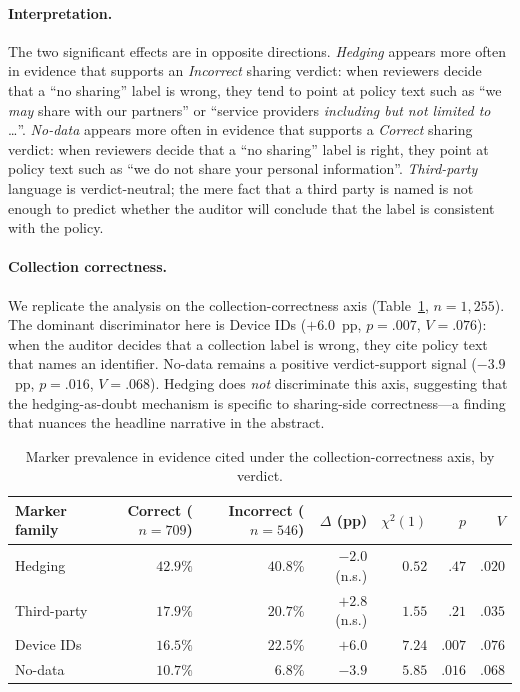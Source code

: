 \documentclass[11pt,a4paper]{article}
\begin{document}
\paragraph{Interpretation.}
The two significant effects are in opposite directions.
\emph{Hedging} appears more often in evidence that supports an
\emph{Incorrect} sharing verdict: when reviewers decide that a
``no sharing'' label is wrong, they tend to point at policy text such
as ``we \emph{may} share with our partners'' or ``service providers
\emph{including but not limited to} \dots''. \emph{No-data} appears
more often in evidence that supports a \emph{Correct} sharing
verdict: when reviewers decide that a ``no sharing'' label is right,
they point at policy text such as ``we do not share your personal
information''. \emph{Third-party} language is verdict-neutral; the
mere fact that a third party is named is not enough to predict whether
the auditor will conclude that the label is consistent with the policy.

\paragraph{Collection correctness.}
We replicate the analysis on the collection-correctness axis
(Table~\ref{tab:disc-collect}, $n=1{,}255$). The dominant
discriminator here is Device IDs ($+6.0$~pp, $p=.007$, $V=.076$):
when the auditor decides that a collection label is wrong, they cite
policy text that names an identifier. No-data remains a positive
verdict-support signal ($-3.9$~pp, $p=.016$, $V=.068$). Hedging
does \emph{not} discriminate this axis, suggesting that the
hedging-as-doubt mechanism is specific to sharing-side
correctness---a finding that nuances the headline narrative in the
abstract.

\begin{table}[t]
\centering\small
\caption{Marker prevalence in evidence cited under the
collection-correctness axis, by verdict.}
\label{tab:disc-collect}
\begin{tabular}{lrrrrrr}
\toprule
Marker family & Correct ($n=709$) & Incorrect ($n=546$) & $\Delta$ (pp) & $\chi^{2}(1)$ & $p$ & $V$ \\
\midrule
Hedging       & $42.9\%$ & $40.8\%$          & $-2.0$ (n.s.) & $0.52$ & $.47$  & $.020$ \\
Third-party   & $17.9\%$ & $20.7\%$          & $+2.8$ (n.s.) & $1.55$ & $.21$  & $.035$ \\
Device IDs    & $16.5\%$ & $\mathbf{22.5\%}$ & $+6.0$        & $7.24$ & $.007$ & $.076$ \\
No-data       & $\mathbf{10.7\%}$ & $\phantom{1}6.8\%$ & $-3.9$ & $5.85$ & $.016$ & $.068$ \\
\bottomrule
\end{tabular}
\end{table}
\end{document}
